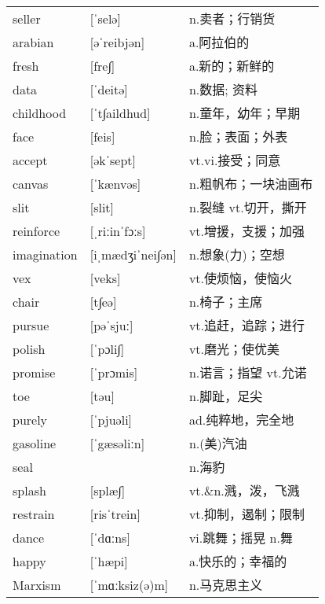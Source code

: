 \documentclass[a4paper]{article}
\begin{document}
\section{}
\begin{tabular}{l l l}

seller & [ˈselə] & n.卖者；行销货 \\
arabian & [əˈreibjən] & a.阿拉伯的 \\
fresh & [fre∫] & a.新的；新鲜的 \\
data & [ˈdeitə] & n.数据; 资料 \\
childhood & [ˈt∫aildhud] & n.童年，幼年；早期 \\
face & [feis] & n.脸；表面；外表 \\
accept & [əkˈsept] & vt.vi.接受；同意 \\
canvas & [ˈkænvəs] & n.粗帆布；一块油画布 \\
slit & [slit] & n.裂缝 vt.切开，撕开 \\
reinforce & [ˌriːinˈfɔːs] & vt.增援，支援；加强 \\
imagination & [iˌmædʒiˈnei∫ən] & n.想象(力)；空想 \\
vex & [veks] & vt.使烦恼，使恼火 \\
chair & [t∫eə] & n.椅子；主席 \\
pursue & [pəˈsjuː] & vt.追赶，追踪；进行 \\
polish & [ˈpɔli∫] & vt.磨光；使优美 \\
promise & [ˈprɔmis] & n.诺言；指望 vt.允诺 \\
toe & [təu] & n.脚趾，足尖 \\
purely & [ˈpjuəli] & ad.纯粹地，完全地 \\
gasoline & [ˈgæsəliːn] & n.(美)汽油 \\
seal &  & n.海豹 \\
splash & [splæ∫] & vt.\&n.溅，泼，飞溅 \\
restrain & [risˈtrein] & vt.抑制，遏制；限制 \\
dance & [ˈdɑːns] & vi.跳舞；摇晃 n.舞 \\
happy & [ˈhæpi] & a.快乐的；幸福的 \\
Marxism & [ˈmɑːksiz(ə)m] & n.马克思主义 \\

\end{tabular}
\end{document}
